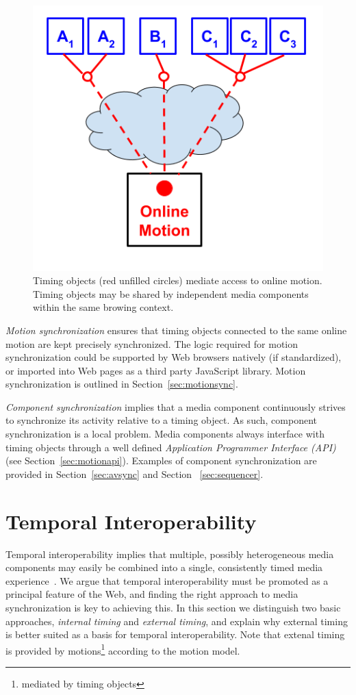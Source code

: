 \documentclass[graybox]{svmult}
\begin{document}
\begin{figure}[h]
\centering
\includegraphics[scale=.4]{fig/motion-model-2.png}
\caption{Timing objects (red unfilled circles) mediate access to online motion. Timing objects may be shared by independent media components within the same browing context.}
\label{fig:model-2}
\end{figure}

\emph{Motion synchronization} ensures that timing objects connected to the
same online motion are kept precisely synchronized. The logic required for
motion synchronization could be supported by Web browsers natively (if
standardized), or imported into Web pages as a third party JavaScript
library. Motion synchronization is outlined in Section~\ref{sec:motionsync}.

\emph{Component synchronization} implies that a media component continuously
strives to synchronize its activity relative to a timing object. As such,
component synchronization is a local problem. Media components always
interface with timing objects through a well defined \emph{Application Programmer Interface (API)} (see
Section~\ref{sec:motionapi}). Examples of component synchronization are provided in Section~\ref{sec:avsync} and Section
~\ref{sec:sequencer}.



\section{Temporal Interoperability}
\label{sec:interoperability}
Temporal interoperability implies that multiple, possibly heterogeneous media
components may easily be combined into a single, consistently timed media
experience~\cite{temporalcomposition}. We argue that temporal interoperability must be promoted as a
principal feature of the Web, and finding the right approach to media
synchronization is key to achieving this. In this section we distinguish two
basic approaches, \emph{internal timing} and \emph{external timing}, and
explain why external timing is better suited as a basis for temporal
interoperability. Note that extenal timing is provided by motions\footnote{mediated by timing objects} 
according to the
motion model.
\end{document}
